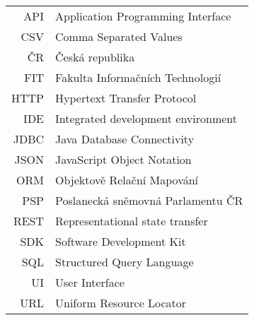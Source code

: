 \documentclass[czech,master,unicode]{ctufit-thesis}
\theoremstyle{plain}
\theoremstyle{definition}
\theoremstyle{remark}
\numberwithin{theorem}{chapter}
\begin{document}
\begin{tabular}{rl}
API & Application Programming Interface\\
CSV & Comma Separated Values\\
ČR & Česká republika\\
FIT & Fakulta Informačních Technologií\\
HTTP & Hypertext Transfer Protocol\\
IDE & Integrated development environment\\
JDBC & Java Database Connectivity\\
JSON & JavaScript Object Notation\\
ORM & Objektově Relační Mapování\\
PSP & Poslanecká sněmovná Parlamentu ČR\\
REST & Representational state transfer\\
SDK & Software Development Kit\\
SQL & Structured Query Language\\
UI & User Interface\\
URL & Uniform Resource Locator
\end{tabular}

\mainmatter\mainmatterinit %



\appendix\appendixinit %


\backmatter %

\printbibliography %

\end{document}
